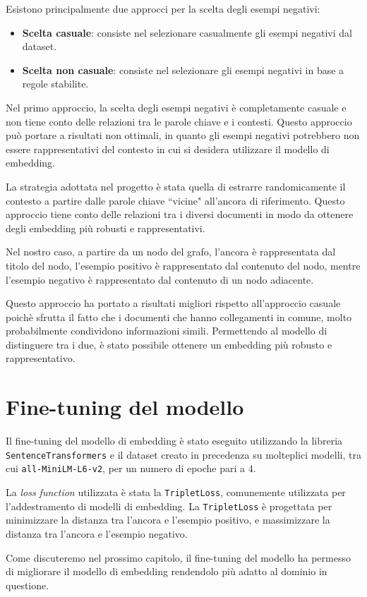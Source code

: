 Esistono principalmente due approcci per la scelta degli
esempi negativi:

\begin{itemize}
      \item \textbf{Scelta casuale}: consiste nel selezionare
            casualmente gli esempi negativi dal dataset.
      \item \textbf{Scelta non casuale}: consiste nel
            selezionare gli esempi negativi in base a regole
            stabilite.
\end{itemize}

Nel primo approccio, la scelta degli esempi negativi è
completamente casuale e non tiene conto delle relazioni tra
le parole chiave e i contesti.
Questo approccio può portare a risultati non ottimali, in
quanto gli esempi negativi potrebbero non essere
rappresentativi del contesto in cui si desidera utilizzare
il modello di embedding.

La strategia adottata nel progetto è stata quella di
estrarre randomicamente il contesto a partire dalle parole
chiave ``vicine" all'ancora di riferimento.
Questo approccio tiene conto delle relazioni tra i diversi
documenti in modo da ottenere degli embedding più robusti e
rappresentativi.

Nel nostro caso, a partire da un nodo del grafo, l'ancora è
rappresentata dal titolo del nodo, l'esempio positivo è
rappresentato dal contenuto del nodo, mentre l'esempio
negativo è rappresentato dal contenuto di un nodo
adiacente.

Questo approccio ha portato a risultati migliori rispetto
all'approccio casuale poichè sfrutta il fatto che i
documenti che hanno collegamenti in comune, molto
probabilmente condividono informazioni simili.
Permettendo al modello di distinguere tra i due, è stato
possibile ottenere un embedding più robusto e
rappresentativo.

\section{Fine-tuning del modello}
\label{sec:fine_tuning}
Il fine-tuning del modello di embedding è stato eseguito
utilizzando la libreria \texttt{SentenceTransformers} e il
dataset creato in precedenza su molteplici modelli, tra cui
\texttt{all-MiniLM-L6-v2}, per un numero di epoche pari a
4.

La \textit{loss function} utilizzata è stata la
\texttt{TripletLoss}\cite{hermans2017defense}, comunemente
utilizzata per l'addestramento di modelli di embedding.
La \texttt{TripletLoss} è progettata per minimizzare la
distanza tra l'ancora e l'esempio positivo, e massimizzare
la distanza tra l'ancora e l'esempio negativo.

Come discuteremo nel prossimo capitolo, il fine-tuning del
modello ha permesso di migliorare il modello di embedding
rendendolo più adatto al dominio in questione.
